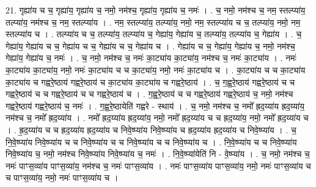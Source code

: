 \documentclass[17pt]{extarticle}
\begin{document}
21. गृह्या॑य च च॒ गृह्या॑य॒ गृह्या॑य च॒ नमो॒ नम॑श्च॒ गृह्या॑य॒ गृह्या॑य च॒ नमः॑ । . च॒ नमो॒ नम॑श्च च॒ नम॒ स्तल्प्या॑य॒ तल्प्या॑य॒ नम॑श्च च॒ नम॒ स्तल्प्या॑य । . नम॒ स्तल्प्या॑य॒ तल्प्या॑य॒ नमो॒ नम॒ स्तल्प्या॑य च च॒ तल्प्या॑य॒ नमो॒ नम॒ स्तल्प्या॑य च । . तल्प्या॑य च च॒ तल्प्या॑य॒ तल्प्या॑य च॒ गेह्या॑य॒ गेह्या॑य च॒ तल्प्या॑य॒ तल्प्या॑य च॒ गेह्या॑य । . च॒ गेह्या॑य॒ गेह्या॑य च च॒ गेह्या॑य च च॒ गेह्या॑य च च॒ गेह्या॑य च । . गेह्या॑य च च॒ गेह्या॑य॒ गेह्या॑य च॒ नमो॒ नम॑श्च॒ गेह्या॑य॒ गेह्या॑य च॒ नमः॑ । . च॒ नमो॒ नम॑श्च च॒ नमः॑ का॒ट्या॑य का॒ट्या॑य॒ नम॑श्च च॒ नमः॑ का॒ट्या॑य । . नमः॑ का॒ट्या॑य का॒ट्या॑य॒ नमो॒ नमः॑ का॒ट्या॑य च च का॒ट्या॑य॒ नमो॒ नमः॑ का॒ट्या॑य च । . का॒ट्या॑य च च का॒ट्या॑य का॒ट्या॑य च गह्वरे॒ष्ठाय॑ गह्वरे॒ष्ठाय॑ च का॒ट्या॑य का॒ट्या॑य च गह्वरे॒ष्ठाय॑ । . च॒ ग॒ह्व॒रे॒ष्ठाय॑ गह्वरे॒ष्ठाय॑ च च गह्वरे॒ष्ठाय॑ च च गह्वरे॒ष्ठाय॑ च च गह्वरे॒ष्ठाय॑ च । . ग॒ह्व॒रे॒ष्ठाय॑ च च गह्वरे॒ष्ठाय॑ गह्वरे॒ष्ठाय॑ च॒ नमो॒ नम॑श्च गह्वरे॒ष्ठाय॑ गह्वरे॒ष्ठाय॑ च॒ नमः॑ । . ग॒ह्व॒रे॒ष्ठायेति॑ गह्वरे - स्थाय॑ । . च॒ नमो॒ नम॑श्च च॒ नमो᳚ ह्रद॒य्या॑य ह्रद॒य्या॑य॒ नम॑श्च च॒ नमो᳚ ह्रद॒य्या॑य । . नमो᳚ ह्रद॒य्या॑य ह्रद॒य्या॑य॒ नमो॒ नमो᳚ ह्रद॒य्या॑य च च ह्रद॒य्या॑य॒ नमो॒ नमो᳚ ह्रद॒य्या॑य च । . ह्र॒द॒य्या॑य च च ह्रद॒य्या॑य ह्रद॒य्या॑य च निवे॒ष्प्या॑य निवे॒ष्प्या॑य च ह्रद॒य्या॑य ह्रद॒य्या॑य च निवे॒ष्प्या॑य । . च॒ नि॒वे॒ष्प्या॑य निवे॒ष्प्या॑य च च निवे॒ष्प्या॑य च च निवे॒ष्प्या॑य च च निवे॒ष्प्या॑य च । . नि॒वे॒ष्प्या॑य च च निवे॒ष्प्या॑य निवे॒ष्प्या॑य च॒ नमो॒ नम॑श्च निवे॒ष्प्या॑य निवे॒ष्प्या॑य च॒ नमः॑ । . नि॒वे॒ष्प्या॑येति॑ नि - वे॒ष्प्या॑य । . च॒ नमो॒ नम॑श्च च॒ नमः॑ पाꣳस॒व्या॑य पाꣳस॒व्या॑य॒ नम॑श्च च॒ नमः॑ पाꣳस॒व्या॑य । . नमः॑ पाꣳस॒व्या॑य पाꣳस॒व्या॑य॒ नमो॒ नमः॑ पाꣳस॒व्या॑य च च पाꣳस॒व्या॑य॒ नमो॒ नमः॑ पाꣳस॒व्या॑य च । \newline
\end{document}

